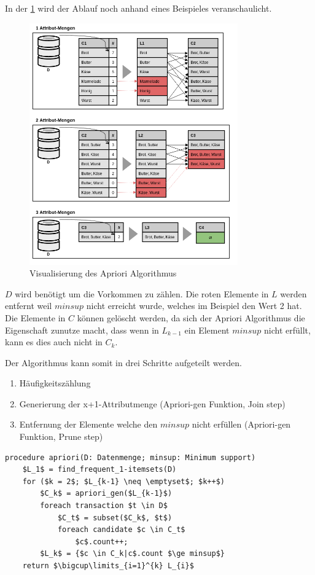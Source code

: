 In der \cref{fig:konzept:vorgehensweise:apriorialgorithmus} wird der Ablauf noch anhand eines Beispieles veranschaulicht.

\begin{figure}[h]
	\RawFloats
	\centering
	\includegraphics[width=0.8\textwidth]{images/Apriori-Algorithmus.png}
	\caption{Visualisierung des Apriori Algorithmus}
	\label{fig:konzept:vorgehensweise:apriorialgorithmus}
\end{figure}

$D$ wird benötigt um die Vorkommen zu zählen. Die roten Elemente in $L$ werden entfernt weil $minsup$ nicht erreicht wurde, welches im Beispiel den Wert 2 hat. Die Elemente in $C$ können gelöscht werden, da sich der Apriori Algorithmus die Eigenschaft zunutze macht, dass wenn in $L_{k-1}$ ein Element $minsup$ nicht erfüllt, kann es dies auch nicht in $C_k$.

Der Algorithmus kann somit in drei Schritte aufgeteilt werden.
\begin{enumerate}
\item Häufigkeitszählung
\item Generierung der x+1-Attributmenge (Apriori-gen Funktion, Join step)
\item Entfernung der Elemente welche den $minsup$ nicht erfüllen (Apriori-gen Funktion, Prune step)
\end{enumerate}

\begin{lstlisting}
procedure apriori(D: Datenmenge; minsup: Minimum support)
	$L_1$ = find_frequent_1-itemsets(D)
	for ($k = 2$; $L_{k-1} \neq \emptyset$; $k++$)
		$C_k$ = apriori_gen($L_{k-1}$)
		foreach transaction $t \in D$
			$C_t$ = subset($C_k$, $t$)
			foreach candidate $c \in C_t$
				$c$.count++;
		$L_k$ = {$c \in C_k|c$.count $\ge minsup$}
	return $\bigcup\limits_{i=1}^{k} L_{i}$
\end{lstlisting}
